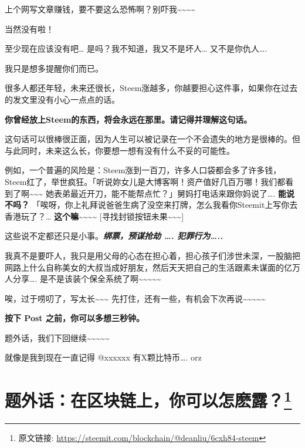 \documentclass[]{ctexbook}
\begin{document}
上个网写文章赚钱，要不要这么恐怖啊？别吓我\textasciitilde{}\textasciitilde{}\textasciitilde{}\textasciitilde{}

当然没有啦！

至少现在应该没有吧\ldots{} 是吗？我不知道，我又不是坏人\ldots{} 又不是你仇人\ldots{}.

我只是想多提醒你们而已。

很多人都还年轻，未来还很长，Steem涨越多，你越要担心这件事，如果你在过去的发文里没有小心一点点的话。

\textbf{你曾经放上Steem的东西，将会永远在那里。请记得并理解这句话。}

这句话可以很棒很正面，因为人生可以被记录在一个不会遗失的地方是很棒的。但与此同时，未来这么长，你要想一想有没有什么不妥的可能性。

例如，一个普遍的风险是：Steem涨到一百刀，许多人口袋都会多了许多钱，Steem红了，举世疯狂。「听说妳女儿是大博客啊！资产值好几百万哪！我们都看到了啊\textasciitilde{}\textasciitilde{}\textasciitilde{} 她表弟最近开刀，能不能帮点忙？」舅妈打电话来跟你妈说了\ldots{}. \textbf{能说不吗？} 「唉呀，你上礼拜说爸爸生病了没空来打牌，怎么我看你Steemit上写你去香港玩了？\ldots{} \textbf{这个嘛}\textasciitilde{}\textasciitilde{}\textasciitilde{}\textasciitilde{} {[}寻找封锁按钮未果\textasciitilde{}\textasciitilde{}\textasciitilde{}{]}

这些说不定都还只是小事。\textbf{\emph{绑票，预谋抢劫 \ldots{}. 犯罪行为\ldots{}..}}

我真不是要吓人，我只是用父母的心态在担心着，担心孩子们涉世未深，一股脑把网路上什么自称美女的大叔当成好朋友，然后天天把自己的生活跟素未谋面的亿万人分享\ldots{}. 是不是该装个保全系统了啊\textasciitilde{}\textasciitilde{}\textasciitilde{}\textasciitilde{}\textasciitilde{}

唉，过于唠叨了，写太长\textasciitilde{}\textasciitilde{}\textasciitilde{} 先打住，还有一些，有机会下次再说\textasciitilde{}\textasciitilde{}\textasciitilde{}\textasciitilde{}\textasciitilde{}

\textbf{按下 Post 之前，你可以多想三秒钟。}

题外话，我们下回继续\textasciitilde{}\textasciitilde{}\textasciitilde{}\textasciitilde{}\textasciitilde{}

就像是我到现在一直记得 @xxxxxx 有X颗比特币\ldots{}. orz

\section[题外话：在区块链上，你可以怎麽露？]{\texorpdfstring{题外话：在区块链上，你可以怎麽露？\footnote{原文链接: \url{https://steemit.com/blockchain/@deanliu/6cxh84-steem}}}{题外话：在区块链上，你可以怎麽露？}}
\end{document}
